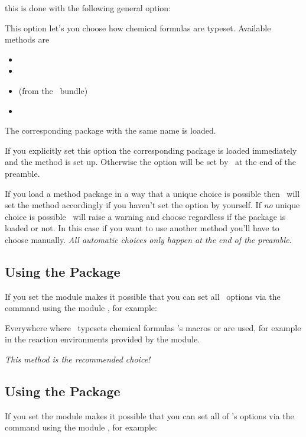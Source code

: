 \documentclass{chemmacros-manual}
\begin{document}
this is done with the following general option:
\begin{options}
    This option let's you choose how chemical formulas are
    typeset.  Available methods are
    \begin{itemize}
      \item {}
      \item {}
      \item {} (from the \XyMTeX\ bundle)
      \item {}
    \end{itemize}
    The corresponding package with the same name is loaded.
\end{options}
If you explicitly set this option the corresponding package is loaded
immediately and the method is set up.  Otherwise the option will be set by
\chemmacros\ at the end of the preamble.

If you load a method package in a way that a unique choice
is possible then \chemmacros\ will set the method accordingly if you haven't
set the option by yourself.  If \emph{no} unique choice is possible
\chemmacros\ will raise a warning and choose  regardless if
the package is loaded or not.  In this case if you want to use another method
you'll have to choose manually. \emph{All automatic choices only happen at the
  end of the preamble}.

\subsection{Using the  Package}
If you set  the  module
makes it possible that you can set all \chemformula\ options via the
 command using the module , for example:
\begin{sourcecode}
\end{sourcecode}

Everywhere where \chemmacros\ typesets chemical formulas \chemformula's macros
 or  are used, for example in the reaction environments
provided by the  module.

\emph{This method is the recommended choice!}

\subsection{Using the  Package}\label{sec:using-mhchem}
If you set  the  module makes
it possible that you can set all of 's options via the
 command using the module , for example:
\begin{sourcecode}
\end{sourcecode}
\end{document}

